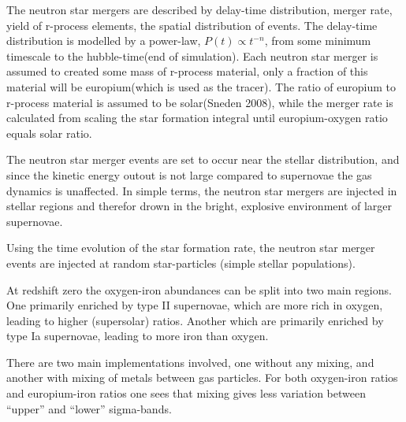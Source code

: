 The neutron star mergers are described by delay-time distribution, merger rate, yield of r-process elements, the spatial distribution of events.
The delay-time distribution is modelled by a power-law, $P(t) \propto t^{-n}$, from some minimum timescale to the hubble-time(end of simulation).
Each neutron star merger is assumed to created some mass of r-process material, only a fraction of this material will be europium(which is used as the tracer).
The ratio of europium to r-process material is assumed to be solar(Sneden 2008), while the merger rate is calculated from scaling the star formation integral until europium-oxygen ratio equals solar ratio.

The neutron star merger events are set to occur near the stellar distribution, and since the kinetic energy outout is not large compared to supernovae the gas dynamics is unaffected.
In simple terms, the neutron star mergers are injected in stellar regions and therefor drown in the bright, explosive environment of larger supernovae.

Using the time evolution of the star formation rate, the neutron star merger events are injected at random star-particles (simple stellar populations).

At redshift zero the oxygen-iron abundances can be split into two main regions. One primarily enriched by type II supernovae, which are more rich in oxygen, leading to higher (supersolar) ratios. Another which are primarily enriched by type Ia supernovae, leading to more iron than oxygen.

There are two main implementations involved, one without any mixing, and another with mixing of metals between gas particles. For both oxygen-iron ratios and europium-iron ratios one sees that mixing gives less variation between ``upper'' and ``lower'' sigma-bands.

